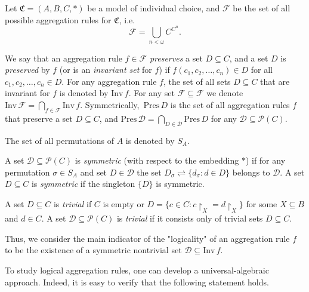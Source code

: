 \documentclass[graybox]{SNmult}
\theoremstyle{definition}
\begin{document}
\par Let $\mathfrak C=(A,  B, C, \ast)$ be a model of individual choice, and $\mathcal F$ be the set of all possible aggregation rules for $\mathfrak C$, i.e.
$$
\mathcal F=\bigcup\limits_{n<\omega}C^{C^n}.
$$
\begin{definition}
	We say that an aggregation rule $f\in \mathcal F$ \textit{preserves} a set \mbox{$  D\subseteq   C$}, and a set $  D$ is \textit{preserved} by $f$ (or is an \textit{invariant set} for $f$) if 
	$
	f( c_1, c_2, \ldots, c_n)\in  D
	$
	for all $ c_1,  c_2,\ldots,  c_n\in   D$. For any aggregation rule $f$, the set of all sets \mbox{$  D\subseteq   C$} that are invariant for $f$ is denoted by $\mathrm{Inv}\, f$. For any set $\mathcal F\subseteq \mathcal F$  we denote $\mathrm{Inv}\, \mathcal F =\bigcap\limits_{f\in \mathcal F}\mathrm{Inv}\, f$. Symmetrically,~$\mathrm{Pres}\, D$ is the set of all aggregation rules $f$ that preserve a set $D\subseteq C$, and $\mathrm{Pres}\, \mathscr D=\bigcap\limits_{D\in \mathscr D}\mathrm{Pres}\, D$ for any $\mathscr D\subseteq \mathscr P(C)$. %
\end{definition}
The set of all permutations of $A$ is denoted by $S_A$.
\begin{definition}
	A set $\mathscr D\subseteq \mathscr P(C)$ is \textit{symmetric} (with respect to the embedding $\ast$) if for any permutation $\sigma \in S_A$ and set $D\in \mathscr D$ the set $D_\sigma\rightleftharpoons	
	\{d_\sigma: d\in D\}$ belongs to $\mathscr D$. A set $D\subseteq C$ is \textit{symmetric} if the singleton $\{D\}$ is symmetric.
\end{definition}
\begin{definition}
	A set $D\subseteq C$ is \textit{trivial} if  $C$ is empty or $D=\{c\in C: c\restriction_X=d\restriction_X\}$ for some $X\subseteq B$ and $d\in C$. %
	A set $\mathscr D\subseteq \mathscr P(C)$ is \textit{trivial} if it consists only of trivial sets $D\subseteq C$. 
\end{definition}

Thus, we consider the main indicator of the "logicality" of an aggregation rule $f$ to be the existence of a symmetric nontrivial set $\mathscr D\subseteq \mathrm{Inv}\, f$. 

\par To study logical aggregation rules, one can develop a universal-algebraic approach. Indeed, it is easy to verify that the following statement holds.
\end{document}
